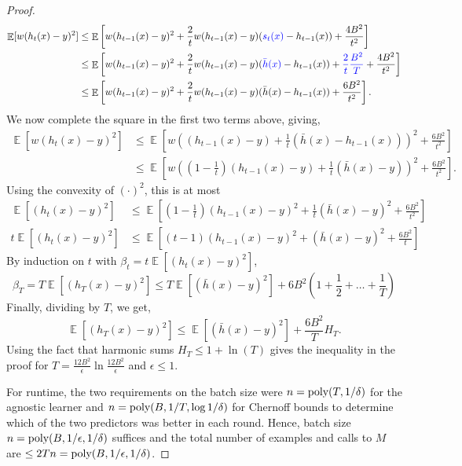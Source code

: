 \documentclass[final, 12pt]{colt2018} %
\newcommand{\eps}{\epsilon}
\newcommand{\E}{\mathop{\mathbb{E}}}
\newcommand{\poly}{\mathop{\mbox{\text{poly}}}}
\begin{document}
\begin{proof}
\begin{align*}
\E[w(h_t(x)-y)^2]
&\leq\E\left[w(h_{t-1}(x)-y)^2 + \frac{2}{t}w(h_{t-1}(x)-y)({\color{blue} s_t(x)}-h_{t-1}(x)) + \frac{4B^2}{t^2}\right]\\
&\leq\E\left[w(h_{t-1}(x)-y)^2 + \frac{2}{t}w(h_{t-1}(x)-y)({\color{blue} \bar{h}(x)}-h_{t-1}(x)) +{\color{blue} \frac{2}{t} \frac{B^2}{T}} + \frac{4B^2}{t^2}\right]\\
&\leq\E\left[w(h_{t-1}(x)-y)^2 + \frac{2}{t}w(h_{t-1}(x)-y)(\bar{h}(x)-h_{t-1}(x)) +\frac{6B^2}{t^2}\right].
\end{align*}
We now complete the square in the first two terms above, giving,
\begin{align*}
\E[w(h_t(x)-y)^2]&\leq \E\left[w\left((h_{t-1}(x)-y) + \frac{1}{t}(\bar{h}(x)-h_{t-1}(x))\right)^2 + \frac{6B^2}{t^2}\right]\\
&\leq \E\left[w\left(\left(1-\frac{1}{t}\right)(h_{t-1}(x)-y) + \frac{1}{t}(\bar{h}(x)-y)\right)^2 + \frac{6B^2}{t^2}\right].
\end{align*}
Using the convexity of $(\cdot)^2$, this is at most
\begin{align*}
\E[(h_t(x)-y)^2]&\leq \E\left[\left(1-\frac{1}{t}\right)(h_{t-1}(x)-y)^2 + \frac{1}{t}(\bar{h}(x)-y)^2 +\frac{6B^2}{t^2}\right]\\
t\E[(h_t(x)-y)^2]&\leq \E\left[\left(t-1\right)(h_{t-1}(x)-y)^2 + (\bar{h}(x)-y)^2  + \frac{6B^2}{t}\right]
\end{align*}
By induction on $t$ with $\beta_t = t\E[(h_t(x)-y)^2]$,
$$\beta_T = T \E[(h_T(x)-y)^2] \leq T \E[(\bar{h}(x)-y)^2] + 6B^2\left(1+\frac{1}{2} + \ldots + \frac{1}{T}\right)$$
Finally, dividing by $T$, we get,
$$\E[(h_T(x)-y)^2] \leq \E[(\bar{h}(x)-y)^2] +  \frac{6B^2}{T}H_T.$$
Using the fact that harmonic sums $H_T \leq 1+ \ln(T)$ gives the inequality in the proof for $T=\frac{12B^2}{\eps}\ln \frac{12B^2}{\eps}$ and $\eps\leq 1$.

For runtime, the two requirements on the batch size were $n=\poly(T, 1/\delta)$ for the agnostic learner and $n=\poly(B,1/T,\log 1/\delta)$ for Chernoff bounds to determine which of the two predictors was better in each round. Hence, batch size $n=\poly(B,1/\eps, 1/\delta)$ suffices and the total number of examples and calls to $M$ are $\leq 2Tn=\poly(B, 1/\eps, 1/\delta)$.
\end{proof}
\end{document}
